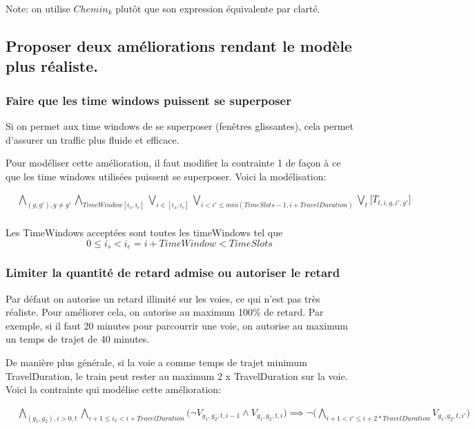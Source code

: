 \documentclass[a4paper]{article}
\begin{document}
Note: on utilise $Chemin_k$ plutôt que son expression équivalente par clarté.

\subsection{Proposer deux améliorations rendant le modèle plus réaliste.}

\subsubsection{Faire que les time windows puissent se superposer}

Si on permet aux time windows de se superposer (fenêtres glissantes), cela permet d'assurer un traffic plus fluide et efficace.

Pour modéliser cette amélioration, il faut modifier la contrainte 1 de façon à ce que les time windows utilisées puissent se superposer. Voici la modélisation:

   \begin{equation*}
    \begin{split}
      & 
      \bigwedge_{(g,g'), g \neq g'} 
      \bigwedge_{TimeWindow [i_s,i_e]}
      \bigvee_{i \in [i_s,i_e]}
      \bigvee_{i < i' \leq min(TimeSlots - 1, i + TravelDuration)}
      \bigvee_{t}
      \big[T_{t,i,g,i', g'}] \\
    \end{split}
    \end{equation*}
    
Les TimeWindows acceptées sont toutes les timeWindows tel que 
$$0 \leq i_s < i_e = i + TimeWindow < TimeSlots$$

\subsubsection{Limiter la quantité de retard admise ou autoriser le retard}

Par défaut on autorise un retard illimité sur les voies, ce qui n'est pas très réaliste. Pour améliorer cela, on autorise au maximum 100\% de retard. Par exemple, si il faut 20 minutes pour parcourrir une voie, on autorise au maximum un temps de trajet de 40 minutes.

De manière plus générale, si la voie a comme temps de trajet minimum TravelDuration, le train peut rester au maximum 2 x TravelDuration sur la voie. Voici la contrainte qui modélise cette amélioration: 

\begin{equation*}
    \begin{split}
      & \bigwedge_{(g_1, g_2), i > 0, t} 
        \bigwedge_{i+1\leq i_2<i+TravelDuration} 
        \big( \neg V_{g_1, g_2, t, i-1} \land  V_{g_1, g_2, t, i}\big)
        \implies   
        \neg \big( 
        \bigwedge_{i + 1 < i' \leq i + 2 * TravelDuration} 
        V_{g_1, g_2, t, i'} \big) \\
    \end{split}
\end{equation*}
\end{document}

